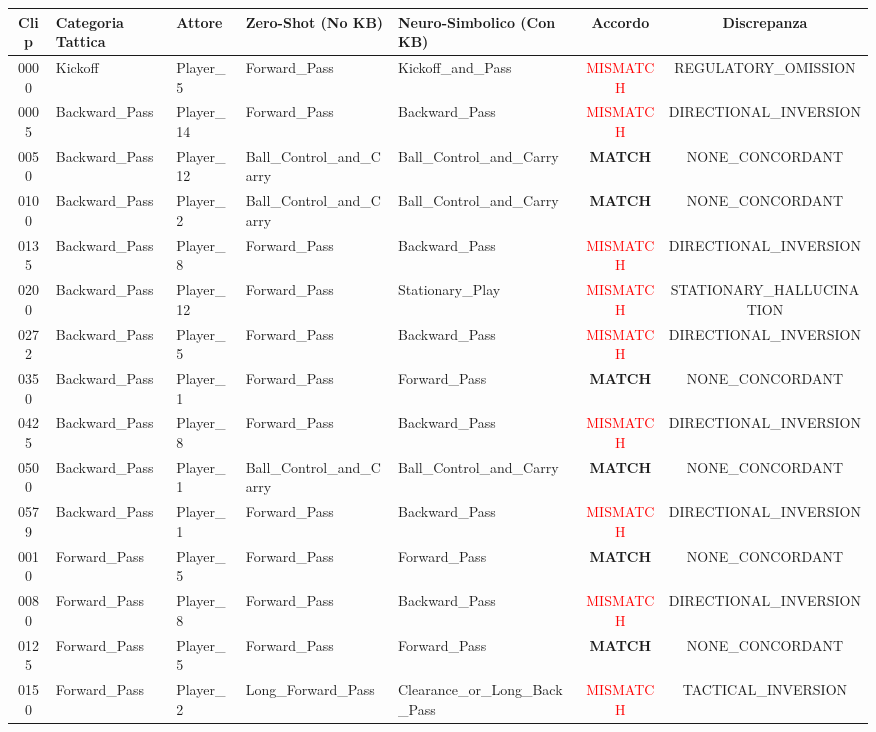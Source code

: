 \begin{table}[t]
\centering
\small
\begin{tabular}{cllllcc}
\hline
\textbf{Clip} & \textbf{Categoria Tattica} & \textbf{Attore} & \textbf{Zero-Shot (No KB)} & \textbf{Neuro-Simbolico (Con KB)} & \textbf{Accordo} & \textbf{Discrepanza} \\
\hline
0000 & Kickoff & Player_5 & Forward\_Pass & Kickoff\_and\_Pass & \textcolor{red}{MISMATCH} & REGULATORY\_OMISSION \\
0005 & Backward\_Pass & Player_14 & Forward\_Pass & Backward\_Pass & \textcolor{red}{MISMATCH} & DIRECTIONAL\_INVERSION \\
0050 & Backward\_Pass & Player_12 & Ball\_Control\_and\_Carry & Ball\_Control\_and\_Carry & \textbf{MATCH} & NONE\_CONCORDANT \\
0100 & Backward\_Pass & Player_2 & Ball\_Control\_and\_Carry & Ball\_Control\_and\_Carry & \textbf{MATCH} & NONE\_CONCORDANT \\
0135 & Backward\_Pass & Player_8 & Forward\_Pass & Backward\_Pass & \textcolor{red}{MISMATCH} & DIRECTIONAL\_INVERSION \\
0200 & Backward\_Pass & Player_12 & Forward\_Pass & Stationary\_Play & \textcolor{red}{MISMATCH} & STATIONARY\_HALLUCINATION \\
0272 & Backward\_Pass & Player_5 & Forward\_Pass & Backward\_Pass & \textcolor{red}{MISMATCH} & DIRECTIONAL\_INVERSION \\
0350 & Backward\_Pass & Player_1 & Forward\_Pass & Forward\_Pass & \textbf{MATCH} & NONE\_CONCORDANT \\
0425 & Backward\_Pass & Player_8 & Forward\_Pass & Backward\_Pass & \textcolor{red}{MISMATCH} & DIRECTIONAL\_INVERSION \\
0500 & Backward\_Pass & Player_1 & Ball\_Control\_and\_Carry & Ball\_Control\_and\_Carry & \textbf{MATCH} & NONE\_CONCORDANT \\
0579 & Backward\_Pass & Player_1 & Forward\_Pass & Backward\_Pass & \textcolor{red}{MISMATCH} & DIRECTIONAL\_INVERSION \\
0010 & Forward\_Pass & Player_5 & Forward\_Pass & Forward\_Pass & \textbf{MATCH} & NONE\_CONCORDANT \\
0080 & Forward\_Pass & Player_8 & Forward\_Pass & Backward\_Pass & \textcolor{red}{MISMATCH} & DIRECTIONAL\_INVERSION \\
0125 & Forward\_Pass & Player_5 & Forward\_Pass & Forward\_Pass & \textbf{MATCH} & NONE\_CONCORDANT \\
0150 & Forward\_Pass & Player_2 & Long\_Forward\_Pass & Clearance\_or\_Long\_Back\_Pass & \textcolor{red}{MISMATCH} & TACTICAL\_INVERSION \\

\end{tabular}
\end{table}
